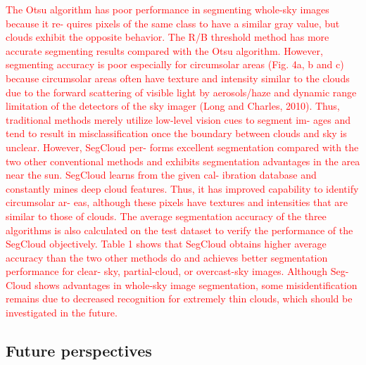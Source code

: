 \documentclass[amt, article]{copernicus}
\begin{document}
\textcolor{red}{The Otsu algorithm has poor
performance in segmenting whole-sky images because it re-
quires pixels of the same class to have a similar gray value,
but clouds exhibit the opposite behavior. The R/B threshold
method has more accurate segmenting results compared with
the Otsu algorithm. However, segmenting accuracy is poor
especially for circumsolar areas (Fig. 4a, b and c) because
circumsolar areas often have texture and intensity similar to
the clouds due to the forward scattering of visible light by
aerosols/haze and dynamic range limitation of the detectors
of the sky imager (Long and Charles, 2010). Thus, traditional
methods merely utilize low-level vision cues to segment im-
ages and tend to result in misclassification once the boundary
between clouds and sky is unclear. However, SegCloud per-
forms excellent segmentation compared with the two other
conventional methods and exhibits segmentation advantages
in the area near the sun. SegCloud learns from the given cal-
ibration database and constantly mines deep cloud features.
Thus, it has improved capability to identify circumsolar ar-
eas, although these pixels have textures and intensities that
are similar to those of clouds.
The average segmentation accuracy of the three algorithms
is also calculated on the test dataset to verify the performance
of the SegCloud objectively. Table 1 shows that SegCloud
obtains higher average accuracy than the two other methods
do and achieves better segmentation performance for clear-
sky, partial-cloud, or overcast-sky images. Although Seg-
Cloud shows advantages in whole-sky image segmentation,
some misidentification remains due to decreased recognition
for extremely thin clouds, which should be investigated in
the future.}

\subsection{Future perspectives}

\conclusions  %
\end{document}
